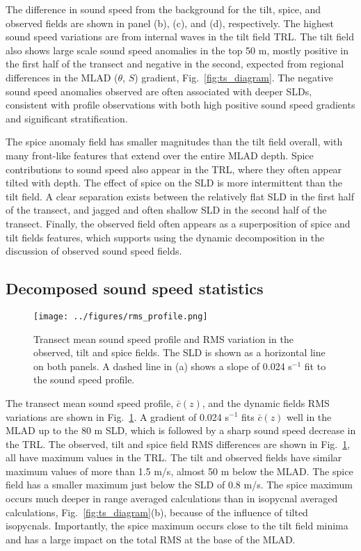 \documentclass[preprint,NumberedRefs]{JASA}
\begin{document}
The difference in sound speed from the background for the tilt, spice, and observed fields are shown in panel (b), (c), and (d), respectively. The highest sound speed variations are from internal waves in the tilt field TRL. The tilt field also shows large scale sound speed anomalies in the top 50 m, mostly positive in the first half of the transect and negative in the second, expected from regional differences in the MLAD ($\theta$, $S$) gradient, Fig.~\ref{fig:ts_diagram}. The negative sound speed anomalies observed are often associated with deeper SLDs, consistent with profile observations with both high positive sound speed gradients and significant stratification.\cite{colosi2020observations}

The spice anomaly field has smaller magnitudes than the tilt field overall, with many front-like features that extend over the entire MLAD depth. Spice contributions to sound speed also appear in the TRL, where they often appear tilted with depth. The effect of spice on the SLD is more intermittent than the tilt field. A clear separation exists between the relatively flat SLD in the first half of the transect, and jagged and often shallow SLD in the second half of the transect. Finally, the observed field often appears as a superposition of spice and tilt fields features, which supports using the dynamic decomposition in the discussion of observed sound speed fields.

\subsection{Decomposed sound speed statistics}\label{ssec:decomp}
\begin{figure}
\texttt{[image: ../figures/rms\_profile.png]}
        \caption{\label{fig:c_rms}{Transect mean sound speed profile and RMS variation in the observed, tilt and spice fields. The SLD is shown as a horizontal line on both panels. A dashed line in (a) shows a slope of 0.024 s$^{-1}$ fit to the sound speed profile.}}
\end{figure}

The transect mean sound speed profile, $\bar{c}(z)$, and the dynamic fields RMS variations are shown in Fig.~\ref{fig:c_rms}. A gradient of 0.024 s$^{-1}$ fits $\bar{c}(z)$ well in the MLAD up to the 80 m SLD, which is followed by a sharp sound speed decrease in the TRL. The observed, tilt and spice field RMS differences are shown in Fig.~\ref{fig:c_rms}, all have maximum values in the TRL. The tilt and observed fields have similar maximum values of more than 1.5 m/s, almost 50 m below the MLAD. The spice field has a smaller maximum just below the SLD of 0.8 m/s. The spice maximum occurs much deeper in range averaged calculations than in isopycnal averaged calculations, Fig.~\ref{fig:ts_diagram}(b), because of the influence of tilted isopycnals.\citep{ferrari2000} Importantly, the spice maximum occurs close to the tilt field minima and has a large impact on the total RMS at the base of the MLAD.
\end{document}
